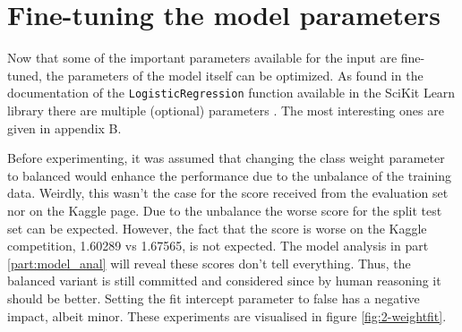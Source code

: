 
\section{Fine-tuning the model parameters}
\label{section:LBM_finetuning_model}

Now that some of the important parameters available for the input are fine-tuned, the parameters of the model itself can be optimized.
As found in the documentation of the \texttt{LogisticRegression} function available in the SciKit Learn library there are multiple (optional) parameters \citep{scikit_learn}.
The most interesting ones are given in appendix B. 

Before experimenting, it was assumed that changing the class weight parameter to balanced would enhance the performance due to the unbalance of the training data.
Weirdly, this wasn't the case for the score received from the evaluation set nor on the Kaggle page.
Due to the unbalance the worse score for the split test set can be expected.
However, the fact that the score is worse on the Kaggle competition, 1.60289 vs 1.67565, is not expected.
The model analysis in part \ref{part:model_anal} will reveal these scores don't tell everything.
Thus, the balanced variant is still committed and considered since by human reasoning it should be better.
Setting the fit intercept parameter to false has a negative impact, albeit minor.
These experiments are visualised in figure \ref{fig:2-weightfit}.

